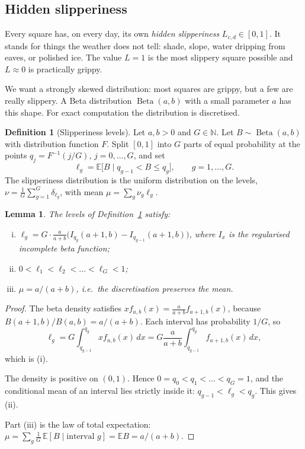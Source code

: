 \documentclass[11pt,a4paper]{article}
\theoremstyle{plain}
\newtheorem{lemma}{Lemma}
\theoremstyle{definition}
\newtheorem{maaritelma}{Definition}
\theoremstyle{remark}
\newcommand{\E}{\mathbb{E}}
\newcommand{\1}{\mathbf{1}}
\newcommand{\Beta}{\operatorname{Beta}}
\begin{document}
\subsection{Hidden slipperiness}

Every square has, on every day, its own \emph{hidden slipperiness}
$L_{c,d} \in [0,1]$. It stands for things the weather does not tell: shade,
slope, water dripping from eaves, or polished ice. The value $L = 1$ is the most
slippery square possible and $L \approx 0$ is practically grippy.

We want a strongly skewed distribution: most squares are grippy, but a few are
really slippery. A Beta distribution $\Beta(a,b)$ with a small parameter $a$ has
this shape. For exact computation the distribution is discretised.

\begin{maaritelma}[Slipperiness levels]\label{maar:tasot}
Let $a, b > 0$ and $G \in \mathbb{N}$. Let $B \sim \Beta(a,b)$ with distribution
function $F$. Split $[0,1]$ into $G$ parts of equal probability at the points
$q_j = F^{-1}(j/G)$, $j = 0, \dots, G$, and set
\[
  \ell_g = \E\bigl[B \mid q_{g-1} < B \le q_g\bigr], \qquad g = 1, \dots, G.
\]
The slipperiness distribution is the uniform distribution on the levels,
$\nu = \frac{1}{G} \sum_{g=1}^{G} \delta_{\ell_g}$, with mean
$\mu = \sum_g \nu_g \ell_g$.
\end{maaritelma}

\begin{lemma}\label{le:tasot}
The levels of Definition~\ref{maar:tasot} satisfy:
\begin{enumerate}[(i)]
  \item $\ell_g = G \cdot \frac{a}{a+b} \bigl(I_{q_g}(a+1, b) - I_{q_{g-1}}(a+1, b)\bigr)$,
  where $I_x$ is the regularised incomplete beta function;
  \item $0 < \ell_1 < \ell_2 < \dots < \ell_G < 1$;
  \item $\mu = a/(a+b)$, i.e.\ the discretisation preserves the mean.
\end{enumerate}
\end{lemma}

\begin{proof}
The beta density satisfies $x f_{a,b}(x) = \frac{a}{a+b} f_{a+1,b}(x)$, because
$B(a+1,b)/B(a,b) = a/(a+b)$. Each interval has probability $1/G$, so
\[
  \ell_g = G \int_{q_{g-1}}^{q_g} x f_{a,b}(x)\,dx
         = G \frac{a}{a+b} \int_{q_{g-1}}^{q_g} f_{a+1,b}(x)\,dx,
\]
which is (i).

The density is positive on $(0,1)$. Hence $0 = q_0 < q_1 < \dots < q_G = 1$, and
the conditional mean of an interval lies strictly inside it:
$q_{g-1} < \ell_g < q_g$. This gives (ii).

Part (iii) is the law of total expectation:
$\mu = \sum_g \frac{1}{G}\, \E[B \mid \text{interval } g] = \E B = a/(a+b)$.
\end{proof}
\end{document}
